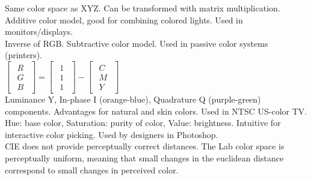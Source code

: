  Same color space as XYZ. Can be transformed with matrix multiplication. Additive color model, good for combining colored lights. Used in monitors/displays. \\
 Inverse of RGB. Subtractive color model. Used in passive color systems (printers). \\
$\begin{bmatrix}
    \begin{smallmatrix}
        R \\ G \\ B
    \end{smallmatrix}
\end{bmatrix} = 
\begin{bmatrix}
    \begin{smallmatrix}
        1 \\ 1 \\ 1
    \end{smallmatrix}
\end{bmatrix} - 
\begin{bmatrix}
    \begin{smallmatrix}
        C \\ M \\ Y
    \end{smallmatrix}
\end{bmatrix}$ \\
 Luminance Y, In-phase I (orange-blue), Quadrature Q (purple-green) components. Advantages for natural and skin colors. Used in NTSC US-color TV. \\
 Hue: base color, Saturation: purity of color, Value: brightness. Intuitive for interactive color picking. Used by designers in Photoshop. \\
 CIE does not provide perceptually correct distances. The Lab color space is perceptually uniform, meaning that small changes in the euclidean distance correspond to small changes in perceived color.